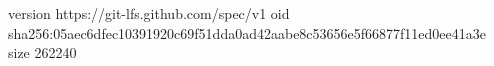 version https://git-lfs.github.com/spec/v1
oid sha256:05aec6dfec10391920c69f51dda0ad42aabe8c53656e5f66877f11ed0ee41a3e
size 262240
